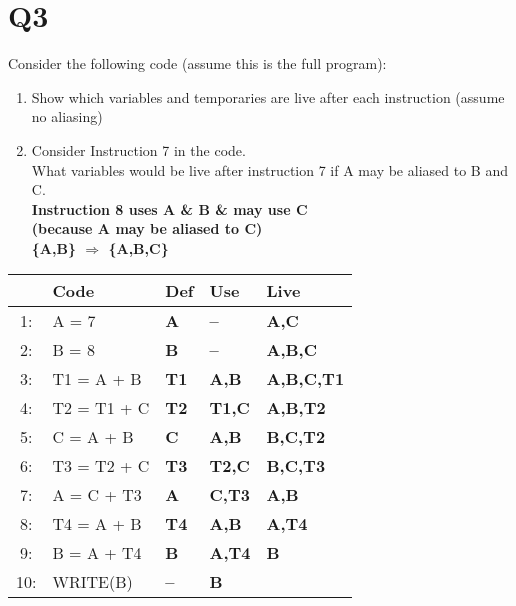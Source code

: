 \documentclass{report}
\begin{document}
\section{Q3}
Consider the following code (assume this is the full program):
\vspace{-1em}
\begin{multicols}{2}
\begin{enumerate}
  \item Show which variables and temporaries are live after each instruction (assume
no aliasing)
  \item Consider Instruction 7 in the code.\\
   What variables would be live after instruction 7 if A may be aliased to B and C. \\
   \textbf{Instruction 8 uses A \& B \& may use C \\
   (because A may be aliased to C) \\
   \{A,B\} $\Rightarrow$ \{A,B,C\}}
\end{enumerate}
  \begin{tabular}{|c|l|>{\bfseries}l|>{\bfseries}l|>{\bfseries}l|}
    \hline
  	& Code & Def & Use & Live \\
    \hline
     1: & A = 7       & A  & --   & {A,C}    \\
     2: & B = 8       & B  & --   & {A,B,C}  \\
     3: & T1 = A + B  & T1 & A,B  & {A,B,C,T1} \\
     4: & T2 = T1 + C & T2 & T1,C & {A,B,T2} \\
     5: & C = A + B   & C  & A,B  & {B,C,T2} \\
     6: & T3 = T2 + C & T3 & T2,C & {B,C,T3} \\
     7: & A = C + T3  & A  & C,T3 & {A,B}    \\
     8: & T4 = A + B  & T4 & A,B  & {A,T4}   \\
     9: & B = A + T4  & B  & A,T4 & {B}      \\
    10: & WRITE(B)    & -- & B    & {}       \\
    \hline
  \end{tabular}
\end{multicols}
\end{document}
